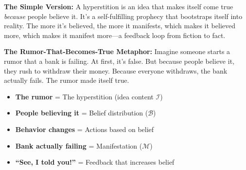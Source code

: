 \documentclass[11pt,twoside]{book}
\begin{document}
\begin{tcolorbox}[colback=green!5!white,colframe=green!65!black,title=\textbf{Plain English: What is a Hyperstition?},breakable]

\textbf{The Simple Version:}
A hyperstition is an idea that makes itself come true \textit{because} people believe it. It's a self-fulfilling prophecy that bootstraps itself into reality. The more it's believed, the more it manifests, which makes it believed more, which makes it manifest more---a feedback loop from fiction to fact.

\textbf{The Rumor-That-Becomes-True Metaphor:}
Imagine someone starts a rumor that a bank is failing. At first, it's false. But because people believe it, they rush to withdraw their money. Because everyone withdraws, the bank actually fails. The rumor made itself true.

\begin{itemize}
    \item \textbf{The rumor} = The hyperstition (idea content $\mathcal{I}$)
    \item \textbf{People believing it} = Belief distribution ($\mathcal{B}$)
    \item \textbf{Behavior changes} = Actions based on belief
    \item \textbf{Bank actually failing} = Manifestation ($\mathcal{M}$)
    \item \textbf{``See, I told you!''} = Feedback that increases belief
\end{itemize}


\end{tcolorbox}
\end{document}
